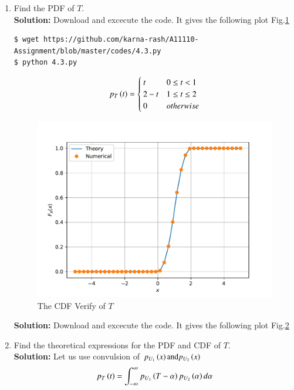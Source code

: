 \documentclass[journal,12pt,twocolumn]{IEEEtran}
\renewcommand\thesection{\arabic{section}}
\begin{document}
\begin{enumerate}[label=\thesection.\arabic*
,ref=\thesection.\theenumi]
\begin{figure}
\label{fig:tri_pdf_verify}
\end{figure}
\item Find the PDF of $T$.\\
\textbf{Solution:}
Download and excecute the code. It gives the following plot Fig.\ref{fig:tri_pdf_verify}
\begin{lstlisting}
$ wget https://github.com/karna-rash/A11110-Assignment/blob/master/codes/4.3.py
$ python 4.3.py
\end{lstlisting}
\begin{equation}
p_T\left(t\right) =\begin{cases}
t & 0 \le t <1 \\
2-t & 1\le t \le2 \\
0 & otherwise
\end{cases}
\end{equation}
\begin{figure}
\centering
\includegraphics[width=\columnwidth]{./figs/tri_cdf_verify}
\caption{The CDF Verify of $T$}
\label{fig:tri_cdf_verify}
\end{figure}
\textbf{Solution:}
Download and excecute the code. It gives the following plot Fig.\ref{fig:tri_cdf_verify}
\item Find the theoretical expressions for the PDF and CDF of $T$.\\
\textbf{Solution:}
Let us use convulsion of $p_{U_1}\left(x\right) \text{and} p_{U_2}\left(x\right)$
\begin{align}
p_T\left(t\right)=\int_{-\infty}^{\infty}p_{U_1}\left(T-\alpha\right)p_{U_2}\left(\alpha\right) d \alpha
\end{align}
\begin{equation}

\end{equation}
\end{enumerate}
\end{document}
